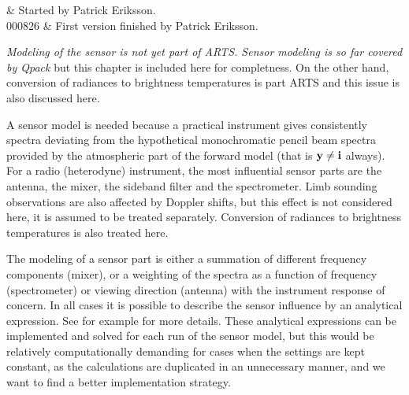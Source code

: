 %
%
 \label{sec:sensor}


%
%
 & Started by Patrick Eriksson.\\
  000826 & First version finished by Patrick Eriksson.\\
\stophistory


%
%
%



%
%
{\it Modeling of the sensor is not yet part of ARTS. Sensor modeling is so
far covered by Qpack} but this chapter is included here for
completness. On the other hand, conversion of radiances to brightness
temperatures is part ARTS and this issue is also discussed here.

A sensor model is needed because a practical instrument gives
consistently spectra deviating from the hypothetical monochromatic
pencil beam spectra provided by the atmospheric part of the forward
model (that is $\mathbf{y}\neq\mathbf{i}$ always). For a radio (heterodyne)
instrument, the most influential sensor parts are the antenna, the
mixer, the sideband filter and the spectrometer. Limb sounding
observations are also affected by Doppler shifts, but this effect is
not considered here, it is assumed to be treated separately.
Conversion of radiances to brightness temperatures is also treated
here.




 \label{sec:sensor:strategy}

 \label{sec:sensor:strategy:h}
 
 The modeling of a sensor part is either a summation of different
 frequency components (mixer), or a weighting of the spectra as a
 function of frequency (spectrometer) or viewing direction (antenna)
 with the instrument response of concern. In all cases it is
 possible to describe the sensor influence by an analytical
 expression. See for example \citet{eriksson:97a} for more details.
 These analytical expressions can be implemented and solved for each
 run of the sensor model, but this would be relatively computationally
 demanding for cases when the settings are kept constant, as the
 calculations are duplicated in an unnecessary manner, and we want to
 find a better implementation strategy.
 
